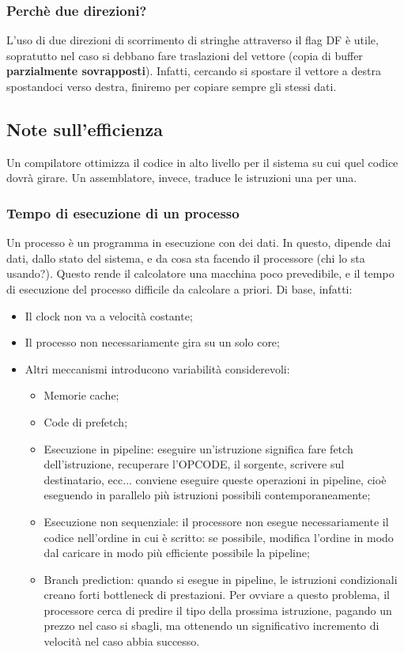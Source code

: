\documentclass[a4paper,11pt]{article}
\begin{document}
\subsubsection{Perchè due direzioni?}
L'uso di due direzioni di scorrimento di stringhe attraverso il flag DF è utile, sopratutto nel caso si debbano fare traslazioni del vettore (copia di buffer \textbf{parzialmente sovrapposti}).
Infatti, cercando si spostare il vettore a destra spostandoci verso destra, finiremo per copiare sempre gli stessi dati.

\subsection{Note sull'efficienza}
Un compilatore ottimizza il codice in alto livello per il sistema su cui quel codice dovrà girare.
Un assemblatore, invece, traduce le istruzioni una per una.

\subsubsection{Tempo di esecuzione di un processo}
Un processo è un programma in esecuzione con dei dati.
In questo, dipende dai dati, dallo stato del sistema, e da cosa sta facendo il processore (chi lo sta usando?).
Questo rende il calcolatore una macchina poco prevedibile, e il tempo di esecuzione del processo difficile da calcolare a priori. Di base, infatti:
\begin{itemize}
	\item Il clock non va a velocità costante;
	\item Il processo non necessariamente gira su un solo core;
	\item Altri meccanismi introducono variabilità considerevoli:
		\begin{itemize}
			\item Memorie cache;
			\item Code di prefetch;
			\item Esecuzione in pipeline: eseguire un'istruzione significa fare fetch dell'istruzione, recuperare l'OPCODE, il sorgente, scrivere sul destinatario, ecc... conviene eseguire queste operazioni in pipeline, cioè eseguendo in parallelo più istruzioni possibili contemporaneamente;
			\item Esecuzione non sequenziale: il processore non esegue necessariamente il codice nell'ordine in cui è scritto: se possibile, modifica l'ordine in modo dal caricare in modo più efficiente possibile la pipeline;
			\item Branch prediction: quando si esegue in pipeline, le istruzioni condizionali creano forti bottleneck di prestazioni. Per ovviare a questo problema, il processore cerca di predire il tipo della prossima istruzione, pagando un prezzo nel caso si sbagli, ma ottenendo un significativo incremento di velocità nel caso abbia successo.
		\end{itemize}
\end{itemize}
\end{document}
